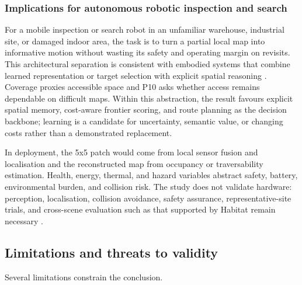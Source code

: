 \documentclass[10pt,letterpaper]{article}
\begin{document}
\subsubsection{Implications for autonomous robotic inspection and search}

For a mobile inspection or search robot in an unfamiliar warehouse, industrial site, or damaged indoor area, the task is to turn a partial local map into informative motion without wasting its safety and operating margin on revisits. This architectural separation is consistent with embodied systems that combine learned representation or target selection with explicit spatial reasoning \citep{chaplot2020activeslam,chaplot2020topological,ramakrishnan2020occupancy}. Coverage proxies accessible space and P10 asks whether access remains dependable on difficult maps. Within this abstraction, the result favours explicit spatial memory, cost-aware frontier scoring, and route planning as the decision backbone; learning is a candidate for uncertainty, semantic value, or changing costs rather than a demonstrated replacement.

In deployment, the 5x5 patch would come from local sensor fusion and localisation and the reconstructed map from occupancy or traversability estimation. Health, energy, thermal, and hazard variables abstract safety, battery, environmental burden, and collision risk. The study does not validate hardware: perception, localisation, collision avoidance, safety assurance, representative-site trials, and cross-scene evaluation such as that supported by Habitat remain necessary \citep{brunke2022safe,savva2019habitat,dulacarnold2019challenges}.

\subsection{Limitations and threats to validity}

Several limitations constrain the conclusion.
\end{document}
